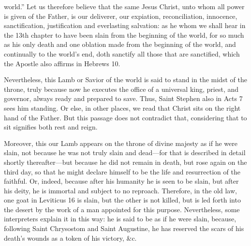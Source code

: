world.” Let us therefore believe that the same Jesus Christ, unto whom all power is given of the Father, is our deliverer, our expiation, reconciliation, innocence, sanctification, justification and everlasting salvation: as he whom we shall hear in the 13th chapter to have been slain from the beginning of the world, for so much as his only death and one oblation made from the beginning of the world, and continually to the world’s end, doth sanctify all those that are sanctified, which the Apostle also affirms in Hebrews 10.

Nevertheless, this Lamb or Savior of the world is said to stand in the midst of the throne, truly because now he executes the office of a universal king, priest, and governor, always ready and prepared to save. Thus, Saint Stephen also in Acts 7 sees him standing. Or else, in other places, we read that Christ sits on the right hand of the Father. But this passage does not contradict that, considering that to sit signifies both rest and reign.

Moreover, this our Lamb appears on the throne of divine majesty as if he were slain, not because he was not truly slain and dead—for that is described in detail shortly thereafter—but because he did not remain in death, but rose again on the third day, so that he might declare himself to be the life and resurrection of the faithful. Or, indeed, because after his humanity he is seen to be slain, but after his deity, he is immortal and subject to no reproach. Therefore, in the old law, one goat in Leviticus 16 is slain, but the other is not killed, but is led forth into the desert by the work of a man appointed for this purpose. Nevertheless, some interpreters explain it in this way: he is said to be as if he were slain, because, following Saint Chrysostom and Saint Augustine, he has reserved the scars of his death’s wounds as a token of his victory, \&c.


